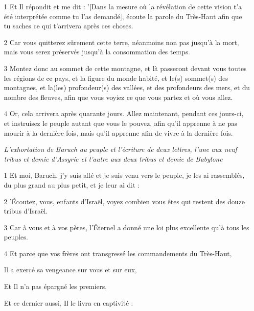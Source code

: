 \par 1 Et Il répondit et me dit : '[Dans la mesure où la révélation de cette vision t'a été interprétée comme tu l'as demandé], écoute la parole du Très-Haut afin que tu saches ce qui t'arrivera après ces choses.

\par 2 Car vous quitterez sûrement cette terre, néanmoins non pas jusqu'à la mort, mais vous serez préservés jusqu'à la consommation des temps.

\par 3 Montez donc au sommet de cette montagne, et là passeront devant vous toutes les régions de ce pays, et la figure du monde habité, et le(s) sommet(s) des montagnes, et la(les) profondeur(s) des vallées, et des profondeurs des mers, et du nombre des fleuves, afin que vous voyiez ce que vous partez et où vous allez.

\par 4 Or, cela arrivera après quarante jours. Allez maintenant, pendant ces jours-ci, et instruisez le peuple autant que vous le pouvez, afin qu'il apprenne à ne pas mourir à la dernière fois, mais qu'il apprenne afin de vivre à la dernière fois.


\par \textit{L'exhortation de Baruch au peuple et l'écriture de deux lettres, l'une aux neuf tribus et demie d'Assyrie et l'autre aux deux tribus et demie de Babylone}


\par 1 Et moi, Baruch, j'y suis allé et je suis venu vers le peuple, je les ai rassemblés, du plus grand au plus petit, et je leur ai dit :

\par 2 'Écoutez, vous, enfants d'Israël, voyez combien vous êtes qui restent des douze tribus d'Israël.

\par 3 Car à vous et à vos pères, l'Éternel a donné une loi plus excellente qu'à tous les peuples.

\par 4 Et parce que vos frères ont transgressé les commandements du Très-Haut,

\par Il a exercé sa vengeance sur vous et sur eux,

\par Et Il n'a pas épargné les premiers,

\par Et ce dernier aussi, Il le livra en captivité :

